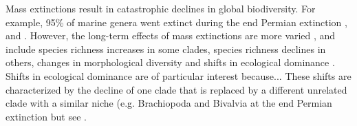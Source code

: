 \documentclass[12pt,letterpaper]{article}
\begin{document}
Mass extinctions result in catastrophic declines in global biodiversity. 
For example, 95\% of marine genera went extinct during the end Permian extinction \citep{RaupPT,BentonPT}, and %
. 
However, the long-term effects of mass extinctions are more varied \citep{Erwin1998344}, and include species richness increases in some clades, species richness declines in others, 
changes in morphological diversity \citep[e.g.][]{friedmanexplosive2010,brusattedinosaur2012} and shifts in ecological dominance \citep[e.g.][]{Brusatte12092008,toljagictriassic-jurassic2013,bensonfaunal2014}. 
Shifts in ecological dominance are of particular interest because... %
These shifts are characterized by the decline of one clade that is replaced by a different unrelated clade with a similar niche \citep{Brusatte12092008} (e.g. Brachiopoda and Bivalvia at the end Permian extinction \citep{Sepkiski1981,CLAPHAM01102006} but see \citep{Payne22052014}. 
\end{document}
